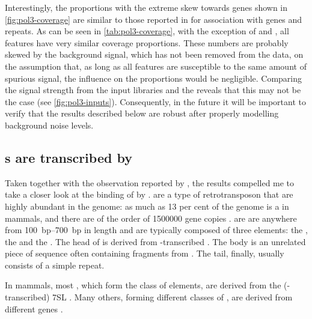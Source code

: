 Interestingly, the proportions with the extreme skew towards \trna genes shown
in \cref{fig:pol3-coverage} are similar to those reported in
\citet{Raha:2010,Canella:2012} for  association with  genes and
repeats. As can be seen in \cref{tab:pol3-coverage}, with the exception of \rrna
and \transline[s], all features have very similar coverage proportions. These
numbers are probably skewed by the  \chipseq background signal, which has
not been removed from the data, on the assumption that, as long as all features
are susceptible to the same amount of spurious signal, the influence on the
proportions would be negligible. Comparing the signal strength from the input
libraries and the  \chip reveals that this may not be the case (see
\cref{fig:pol3-inputs}). Consequently, in the future it will be important to
verify that the results described below are robust after properly modelling
background noise levels.

\subsection{s are transcribed by }

Taken together with the observation reported by \citet{Carriere:2012}, the
results compelled me to take a closer look at the binding of \transsine[s] by
. \transsine[s] are a type of retrotransposon that are highly abundant in
the genome: as much as \num{13} per cent of the genome is a \transsine in
mammals, and there are of the order of \num{1500000} gene copies
\citep{Lander:2001}. \transsine[s] are are anywhere from \SIrange{100}{700}{bp}
in length and are typically composed of three elements: the , the
 and the . The head of \transsine[s] is derived from
-transcribed \rna[s]. The body is an unrelated piece of sequence often
containing fragments from \transline[s]. The tail, finally, usually consists of
a simple repeat.

In mammals, most \transsine[s], which form the class of  elements,
are derived from the (-transcribed) 7SL \ncrna. Many others, forming
different classes of \transsine[s], are derived from different \trna genes
\citep{Vassetzky:2013}.

